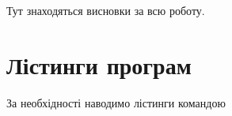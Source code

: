 \documentclass{pma-report}
\begin{document}
\conclusions
Тут знаходяться висновки за всю роботу.




\appendix
\chapter{Лістинги програм}\label{app:listings} %
За необхідності наводимо лістинги командою
\verb||
\end{document}
